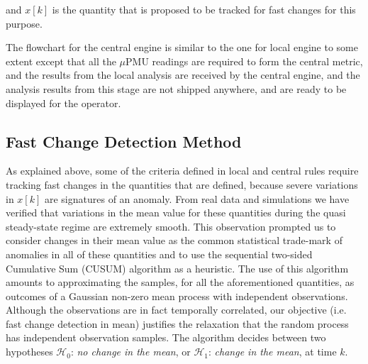 \documentclass[twocolumn]{IEEEtran}
\newcommand{\mup}{\mu \text{PMU}}
\begin{document}
and $x[k]$ is the quantity that is proposed to be tracked for fast changes for this purpose.

The flowchart for the central engine is similar to the one for local engine to some extent except that all the $\mup$ readings are required to form the central metric, and the results from the local analysis are received by the central engine, and the analysis results from this stage are not shipped anywhere, and are ready to be displayed for the operator. 
\subsection{Fast Change Detection Method}
\label{sec:change_det}
As explained above, some of the criteria defined in local and central rules require tracking fast changes in the quantities that are defined, because severe variations in $x[k]$ are signatures of an anomaly. From real data and simulations we have verified that variations in the mean value for these quantities during the quasi steady-state regime are extremely smooth. This observation prompted us to consider changes in their mean value as the common statistical trade-mark of anomalies in all of these quantities and to use the sequential two-sided Cumulative Sum (CUSUM) algorithm \cite{page1954continuous,basseville1993detection} as a heuristic. The use of this algorithm amounts to approximating the samples, for all the aforementioned quantities, as outcomes of a Gaussian non-zero mean process with independent observations. Although the observations are in fact temporally correlated, our objective (i.e. fast change detection in mean) justifies the relaxation that the random process has independent observation samples. The algorithm decides between two hypotheses $\mathcal{H}_0$: {\it no change in the mean}, or $\mathcal{H}_1$: {\it change in the mean}, at time $k$.%
\end{document}
